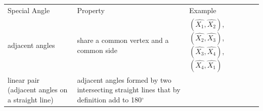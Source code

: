 {\begin{center}
\begin{xtabular*}{\mytablewidth}[t]{|p{10\mystarwidth}|p{10\mystarwidth}|p{10\mystarwidth}|}
        Special Angle &
        Property &
        Example%
     \tabularnewline{}
        adjacent angles &
        share a common vertex and a common side &
        \begin{math}\left(\hat{{X}_{1}},\hat{{X}_{2}}\right)\end{math}, \begin{math}\left(\hat{{X}_{2}},\hat{{X}_{3}}\right)\end{math}, \begin{math}\left(\hat{{X}_{3}},\hat{{X}_{4}}\right)\end{math}, \begin{math}\left(\hat{{X}_{4}},\hat{{X}_{1}}\right)\end{math}%
     \tabularnewline{}
        linear pair (adjacent angles on a straight line) &
        adjacent angles formed by two intersecting straight lines that by definition add to 180\begin{math}{}^{\circ }\end{math} &

\end{xtabular*}
\end{center}}
